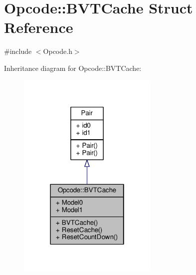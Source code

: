 \hypertarget{structOpcode_1_1BVTCache}{}\section{Opcode\+:\+:B\+V\+T\+Cache Struct Reference}
\label{structOpcode_1_1BVTCache}


{\ttfamily \#include $<$Opcode.\+h$>$}



Inheritance diagram for Opcode\+:\+:B\+V\+T\+Cache\+:
\nopagebreak
\begin{figure}[H]
\begin{center}
\leavevmode
\includegraphics[width=190pt]{d5/d78/structOpcode_1_1BVTCache__inherit__graph}
\end{center}
\end{figure}


